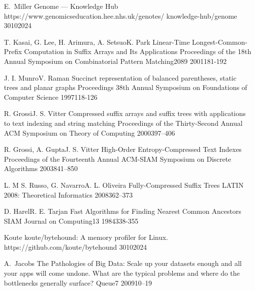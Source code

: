 \spletniVirZAvtorjem
    {E.~Miller}
    {Genome — Knowledge Hub}
    {\newline https://www.genomicseducation.hee.nhs.uk/genotes/ knowledge-hub/genome}
    {30}{10}{2024}

\clanekVRevijiVecAvtorjev
    {T. Kasai, G. Lee, H. Arimura, A. Setsuo}{K. Park}
    {Linear-Time Longest-Common-Prefix Computation in Suffix Arrays and Its Applications}
    {Proceedings of the 18th Annual Symposium on Combinatorial Pattern Matching}{2089}
    {2001}{181-192}

\clanekVRevijiVecAvtorjev
    {J. I. Munro}{V. Raman}
    {Succinct representation of balanced parentheses, static trees and planar graphs}
    {Proceedings 38th Annual Symposium on Foundations of Computer Science}{}
    {1997}{118-126}

\clanekVRevijiVecAvtorjev
    {R. Grossi}{J. S. Vitter}
    {Compressed suffix arrays and suffix trees with applications to text indexing and string matching }
    {Proceedings of the Thirty-Second Annual ACM Symposium on Theory of Computing}{}
    {2000}{397–406}

\clanekVRevijiVecAvtorjev
    {R. Grossi, A. Gupta}{J. S. Vitter}
    {High-Order Entropy-Compressed Text Indexes }
    {Proceedings of the Fourteenth Annual ACM-SIAM Symposium on Discrete Algorithms}{}
    {2003}{841–850}

\clanekVRevijiVecAvtorjev
    {L. M S. Russo, G. Navarro}{A. L. Oliveira}
    {Fully-Compressed Suffix Trees}
    {LATIN 2008: Theoretical Informatics}{}
    {2008}{362--373}

\clanekVRevijiVecAvtorjev
    {D. Harel}{R. E. Tarjan}
    {Fast Algorithms for Finding Nearest Common Ancestors}
    {SIAM Journal on Computing}{13}
    {1984}{338-355}

\spletniVirZAvtorjem
    {Koute}
    {koute/bytehound: A memory profiler for Linux.}
    {https://github.com/koute/bytehound}
    {30}{10}{2024}

\clanekVRevijiEnAvtor
    {A.~Jacobs}
    {The Pathologies of Big Data: Scale up your datasets enough and all your apps will come undone. What are the typical problems and where do the bottlenecks generally surface?}
    {Queue}{7}
    {2009}{10--19}
    


